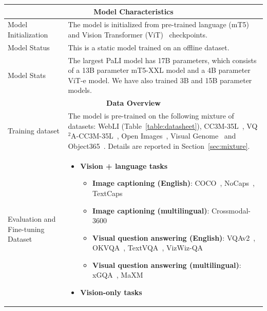 \begin{longtable}[c]{ p{} | p{} }
\multicolumn{2}{c}{\textbf{Model Characteristics}}      \\ \toprule
\multicolumn{1}{l|}{Model Initialization} & The model is initialized from pre-trained language (mT5)~\citep{xue-2021-mt5} and Vision Transformer (ViT)~\citep{zhai-21-scalingvit,dosovitskiy-2021-vit} checkpoints.  \\ \midrule
\multicolumn{1}{l|}{Model Status} & This is a static model trained on an offline dataset.  \\ \midrule
\multicolumn{1}{l|}{Model Stats} & The largest PaLI model has 17B parameters, which consists of a 13B parameter mT5-XXL model and a 4B parameter ViT-e model. We have also trained 3B and 15B parameter models. \\
\toprule

\multicolumn{2}{c}{\textbf{Data Overview}}      \\ \toprule
\multicolumn{1}{l|}{Training dataset} &
The model is pre-trained on the following mixture of datasets: WebLI (Table~\ref{table:datasheet}), %
CC3M-35L~\citep{cc3m}, VQ$^2$A-CC3M-35L~\citep{changpinyo-2022-vq2a}, Open Images~\citep{kuznetsova2020open}, Visual Genome~\citep{krishna-17-visualgenome} and Object365~\citep{o365}.
Details are reported in Section~\ref{sec:mixture}. \\\toprule
\multicolumn{1}{l|}{Evaluation and Fine-tuning Dataset} &
\begin{itemize}
    \item \textbf{Vision + language tasks}
        \begin{itemize}
            \item \textbf{Image captioning (English)}:
            COCO~\citep{coco},
            NoCaps~\citep{nocaps},
            TextCaps~\citep{textcaps}
            \item \textbf{Image captioning (multilingual)}: Crossmodal-3600~\citep{xm3600}
            \item \textbf{Visual question answering (English)}:
            VQAv2~\citep{vqav2},
            OKVQA~\citep{kat-okvqa-2022},
            TextVQA~\citep{textvqa},
            VizWiz-QA~\citep{gurari2018vizwiz}
            \item \textbf{Visual question answering (multilingual)}: xGQA~\citep{xgqa},
            MaXM~\citep{maxm}
        \end{itemize}
    \item \textbf{Vision-only tasks}
        \begin{itemize}

\end{itemize}
\end{itemize}
\end{longtable}
